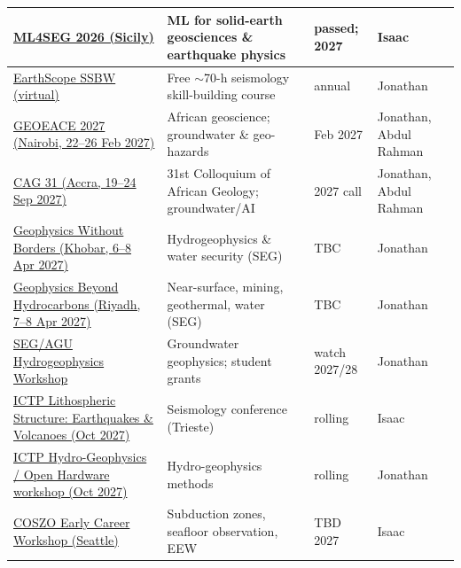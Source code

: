 \documentclass[11pt,a4paper]{article}
\begin{document}
\begin{longtable}{@{}p{3.4cm}p{5.6cm}p{2.2cm}p{2.7cm}@{}}
\midrule
\href{https://www.ml4seg.org/}{ML4SEG 2026 (Sicily)} & ML for solid-earth geosciences \& earthquake physics & passed; 2027 & Isaac \\
\midrule
\href{https://www.earthscope.org/event/2026-seismology-skill-building-workshop-ssbw/}{EarthScope SSBW (virtual)} & Free $\sim$70-h seismology skill-building course & annual & Jonathan \\
\midrule
\href{https://gsk.or.ke/geoeace27/}{GEOEACE 2027 (Nairobi, 22--26 Feb 2027)} & African geoscience; groundwater \& geo-hazards & Feb 2027 & Jonathan, Abdul Rahman \\
\midrule
\href{https://www.cag31gh.org/}{CAG 31 (Accra, 19--24 Sep 2027)} & 31st Colloquium of African Geology; groundwater/AI & 2027 call & Jonathan, Abdul Rahman \\
\midrule
\href{https://seg.org/calendar_events/geophysics-without-borders-2027/}{Geophysics Without Borders (Khobar, 6--8 Apr 2027)} & Hydrogeophysics \& water security (SEG) & TBC & Jonathan \\
\midrule
\href{https://seg.org/calendar_events/geophysics-beyond-hydrocarbons-2027/}{Geophysics Beyond Hydrocarbons (Riyadh, 7--8 Apr 2027)} & Near-surface, mining, geothermal, water (SEG) & TBC & Jonathan \\
\midrule
\href{https://seg.org/calendar_events/seg-agu-hydrogeophysics-workshop/}{SEG/AGU Hydrogeophysics Workshop} & Groundwater geophysics; student grants & watch 2027/28 & Jonathan \\
\midrule
\href{https://www.ictp.it/home/scientific-calendar}{ICTP Lithospheric Structure: Earthquakes \& Volcanoes (Oct 2027)} & Seismology conference (Trieste) & rolling & Isaac \\
\midrule
\href{https://www.ictp.it/home/scientific-calendar}{ICTP Hydro-Geophysics / Open Hardware workshop (Oct 2027)} & Hydro-geophysics methods & rolling & Jonathan \\
\midrule
\href{https://coszo.org/}{COSZO Early Career Workshop (Seattle)} & Subduction zones, seafloor observation, EEW & TBD 2027 & Isaac \\
\midrule


\end{longtable}
\end{document}
